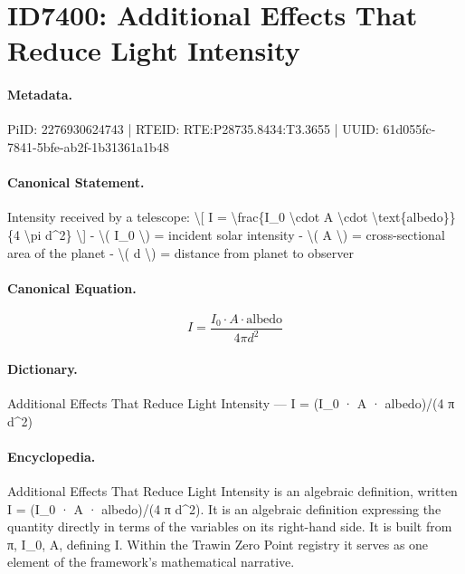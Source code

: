 \section*{ID7400: Additional Effects That Reduce Light Intensity}
\paragraph{Metadata.}
PiID: 2276930624743 | RTEID: RTE:P28735.8434:T3.3655 | UUID: 61d055fc-7841-5bfe-ab2f-1b31361a1b48

\paragraph{Canonical Statement.}
Intensity received by a telescope: \textbackslash{}[ I = \textbackslash{}frac\{I\_0 \textbackslash{}cdot A \textbackslash{}cdot \textbackslash{}text\{albedo\}\}\{4 \textbackslash{}pi d\textasciicircum{}2\} \textbackslash{}] - \textbackslash{}( I\_0 \textbackslash{}) = incident solar intensity - \textbackslash{}( A \textbackslash{}) = cross-sectional area of the planet - \textbackslash{}( d \textbackslash{}) = distance from planet to observer

\paragraph{Canonical Equation.}
\[
I = \frac{I_0 \cdot A \cdot \text{albedo}}{4 \pi d^2}
\]

\paragraph{Dictionary.}
Additional Effects That Reduce Light Intensity — I = (I\_0 · A · albedo)/(4 π d\textasciicircum{}2)

\paragraph{Encyclopedia.}
Additional Effects That Reduce Light Intensity is an algebraic definition, written I = (I\_0 · A · albedo)/(4 π d\textasciicircum{}2). It is an algebraic definition expressing the quantity directly in terms of the variables on its right-hand side. It is built from π, I\_0, A, defining I. Within the Trawin Zero Point registry it serves as one element of the framework's mathematical narrative.
